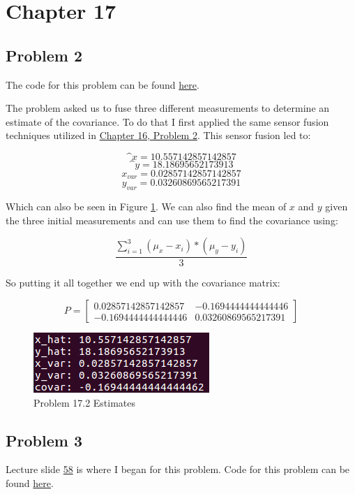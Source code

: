 \documentclass{article}
\newcommand\ddfrac[2]{\frac{\displaystyle #1}{\displaystyle #2}}
\begin{document}
\newpage
\section{\textbf{Chapter 17}}
\subsection{Problem 2}
The code for this problem can be found 
\href{https://github.com/macattackftw/RoboticsHW/blob/master/HW5/problem17_2.py}{here}.

The problem asked us to fuse three different measurements to determine an 
estimate of the covariance. To do that I first applied the same sensor fusion 
techniques utilized in \hyperref[problem:16.2]{Chapter 16, Problem 2}. This 
sensor fusion led to:

$$\^{x} = 10.557142857142857$$
$$\^{y} = 18.18695652173913$$
$$x_{var} = 0.02857142857142857$$
$$y_{var} = 0.03260869565217391$$

Which can also be seen in Figure \ref{fig:p17_2}. We can also find the mean of 
$x$ and $y$ given the three initial measurements and can use them to find the 
covariance using:

$$\ddfrac{\sum_{i=1}^{3} (\mu_x - x_i) * (\mu_y - y_i)}{3}$$

So putting it all together we end up with the covariance matrix:

\[
P =
  \begin{bmatrix}
    0.02857142857142857 & -0.1694444444444446 \\
    -0.1694444444444446 & 0.03260869565217391
  \end{bmatrix}
\]

\begin{figure}[h]
    \centering
    \includegraphics[scale=2.5]{problem17_2_data}
    \caption{Problem 17.2 Estimates}
    \label{fig:p17_2}
\end{figure}


\newpage
\subsection{Problem 3}
Lecture slide \href{https://d2l.sdbor.edu/content/enforced/2018FA/1139913-CENG-CSC-415-515-M001-2018FAIntroductiontoRobot/Robotics_Kalman.pdf}{58} is where I began for this problem. Code for this 
problem can be found 
\href{https://github.com/macattackftw/RoboticsHW/blob/master/HW5/problem17_3.py}{here}.
\end{document}
